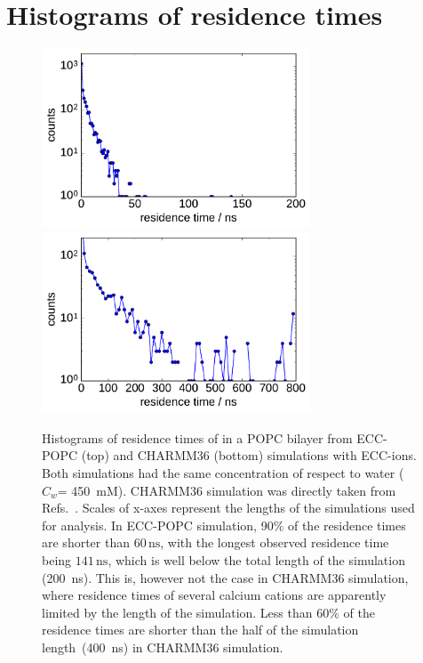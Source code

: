\documentclass[journal=jpcbfk]{achemso}
\begin{document}
\newpage
\section{Histograms of residence times}

\begin{figure}[!h]
  \centering
  \includegraphics[width=8.0cm]{../Fig/ipython_nb/histogram_bound_times_ECC-lipids_346mM_CaCl.pdf} \\
  \includegraphics[width=8.0cm]{../Fig/ipython_nb/histogram_bound_times_Charmm36_450mM_CaCl_Matti.pdf}
  \caption{\label{fig:hist_residence_times}
   Histograms of residence times of  in a POPC bilayer
   from ECC-POPC (top) and CHARMM36 (bottom) simulations with ECC-ions.
   Both simulations had the same concentration of  respect to water ($C_w$= 450~mM).
   CHARMM36 simulation was directly taken from Refs.~.
   Scales of x-axes represent the lengths of the simulations used for analysis.
   In ECC-POPC simulation, 90\% of the residence times are
   shorter than $60\,\mathrm{ns}$, %
   with the longest observed residence time being $141\,\mathrm{ns}$,
   which is well below the total length of the simulation (200~ns).
   This is, however not the case in CHARMM36 simulation,
   where residence times of several calcium cations are    
   apparently limited by the length of the simulation.
   Less than 60\% of the residence times are
   shorter than the half of the simulation length~(400~ns)
   in CHARMM36 simulation.
  }
\end{figure}
\end{document}
